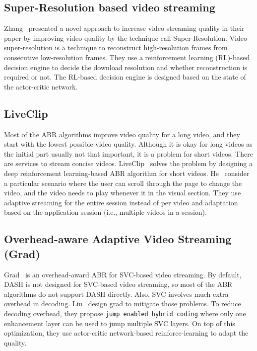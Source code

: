 \subsection{Super-Resolution based video streaming}
Zhang \etal\ presented a novel approach to increase video streaming quality in their paper \cite{9155384} by improving video quality by the technique call Super-Resolution. Video super-resolution is a technique to reconstruct high-resolution frames from consecutive low-resolution frames. They use a reinforcement learning (RL)-based decision engine to decide the download resolution and whether reconstruction is required or not. The RL-based decision engine is designed based on the state of the actor-critic network.

\subsection{LiveClip}
Most of the ABR algorithms improve video quality for a long video, and they start with the lowest possible video quality. Although it is okay for long videos as the initial part usually not that important, it is a problem for short videos. There are services to stream concise videos. LiveClip~\cite{10.1145/3386290.3396937} solves the problem by designing a deep reinforcement learning-based ABR algorithm for short videos. He \etal\ consider a particular scenario where the user can scroll through the page to change the video, and the video needs to play whenever it in the visual section. They use adaptive streaming for the entire session instead of per video and adaptation based on the application session (i.e., multiple videos in a session).

\subsection{Overhead-aware Adaptive Video Streaming (Grad)}
Grad~\cite{10.1145/3394171.3413512} is an overhead-award ABR for SVC-based video streaming. By default, DASH is not designed for SVC-based video streaming, so most of the ABR algorithms do not support DASH directly. Also, SVC involves much extra overhead in decoding. Liu \etal\ design grad to mitigate those problems. To reduce decoding overhead, they propose {\tt jump enabled hybrid coding} where only one enhancement layer can be used to jump multiple SVC layers. On top of this optimization, they use actor-critic network-based reinforce-learning to adapt the quality.

